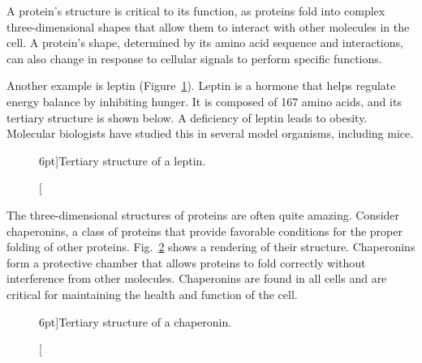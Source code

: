 A protein's structure is critical to its function, as proteins fold into complex three-dimensional shapes that allow them to interact with other molecules in the cell. A protein’s shape, determined by its amino acid sequence and interactions, can also change in response to cellular signals to perform specific functions.

Another example is leptin (Figure~\ref{fig:leptin}). Leptin is a hormone that helps regulate energy balance by inhibiting hunger. It is composed of 167 amino acids, and its tertiary structure is shown below. A deficiency of leptin leads to obesity. Molecular biologists have studied this in several model organisms, including mice.

\begin{figure}
    \caption[][6pt]{Tertiary structure of a leptin.}
    \label{fig:leptin}
\end{figure}

The three-dimensional structures of proteins are often quite amazing. Consider chaperonins, a class of proteins that provide favorable conditions for the proper folding of other proteins. Fig.~\ref{fig:chaperonin} shows a rendering of their structure. Chaperonins form a protective chamber that allows proteins to fold correctly without interference from other molecules. Chaperonins are found in all cells and are critical for maintaining the health and function of the cell.
    
\begin{figure}
    \caption[][6pt]{Tertiary structure of a chaperonin.}
    \label{fig:chaperonin}
\end{figure}

